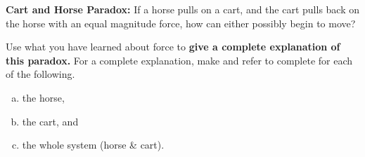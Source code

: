 \label{fnt8.1.1-1}

\textbf{Cart and Horse Paradox:} If a horse pulls on a cart, and the cart pulls back on the horse with an equal magnitude force, how can either possibly begin to move?

Use what you have learned about force to \textbf{give a complete explanation of this paradox.} For a complete explanation, make and refer to complete \forcediags{} for each of the following.
\begin{enumerate}[(a)]
	\item the horse, 
	\item the cart, and 
	\item the whole system (horse \& cart).
\end{enumerate}